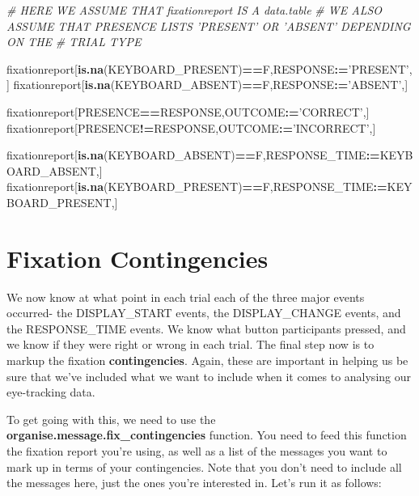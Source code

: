 \documentclass[]{book}
\newenvironment{Shaded}{\begin{snugshade}}{\end{snugshade}}
\newcommand{\CommentTok}[1]{\textcolor[rgb]{0.56,0.35,0.01}{\textit{#1}}}
\newcommand{\ErrorTok}[1]{\textcolor[rgb]{0.64,0.00,0.00}{\textbf{#1}}}
\newcommand{\KeywordTok}[1]{\textcolor[rgb]{0.13,0.29,0.53}{\textbf{#1}}}
\newcommand{\NormalTok}[1]{#1}
\newcommand{\OperatorTok}[1]{\textcolor[rgb]{0.81,0.36,0.00}{\textbf{#1}}}
\newcommand{\StringTok}[1]{\textcolor[rgb]{0.31,0.60,0.02}{#1}}
\begin{document}
\begin{Shaded}
\begin{Highlighting}[]
\CommentTok{# HERE WE ASSUME THAT fixationreport IS A data.table}
\CommentTok{# WE ALSO ASSUME THAT PRESENCE LISTS 'PRESENT' OR 'ABSENT' DEPENDING ON THE}
\CommentTok{# TRIAL TYPE}

\NormalTok{fixationreport[}\KeywordTok{is.na}\NormalTok{(KEYBOARD_PRESENT)}\OperatorTok{==}\NormalTok{F,RESPONSE}\OperatorTok{:}\ErrorTok{=}\StringTok{'PRESENT'}\NormalTok{,]}
\NormalTok{fixationreport[}\KeywordTok{is.na}\NormalTok{(KEYBOARD_ABSENT)}\OperatorTok{==}\NormalTok{F,RESPONSE}\OperatorTok{:}\ErrorTok{=}\StringTok{'ABSENT'}\NormalTok{,]}

\NormalTok{fixationreport[PRESENCE}\OperatorTok{==}\NormalTok{RESPONSE,OUTCOME}\OperatorTok{:}\ErrorTok{=}\StringTok{'CORRECT'}\NormalTok{,]}
\NormalTok{fixationreport[PRESENCE}\OperatorTok{!=}\NormalTok{RESPONSE,OUTCOME}\OperatorTok{:}\ErrorTok{=}\StringTok{'INCORRECT'}\NormalTok{,]}

\NormalTok{fixationreport[}\KeywordTok{is.na}\NormalTok{(KEYBOARD_ABSENT)}\OperatorTok{==}\NormalTok{F,RESPONSE_TIME}\OperatorTok{:}\ErrorTok{=}\NormalTok{KEYBOARD_ABSENT,]}
\NormalTok{fixationreport[}\KeywordTok{is.na}\NormalTok{(KEYBOARD_PRESENT)}\OperatorTok{==}\NormalTok{F,RESPONSE_TIME}\OperatorTok{:}\ErrorTok{=}\NormalTok{KEYBOARD_PRESENT,]}
\end{Highlighting}
\end{Shaded}

\hypertarget{fixation-contingencies}{%
\section{Fixation Contingencies}\label{fixation-contingencies}}

We now know at what point in each trial each of the three major events occurred- the DISPLAY\_START events, the DISPLAY\_CHANGE events, and the RESPONSE\_TIME events. We know what button participants pressed, and we know if they were right or wrong in each trial. The final step now is to markup the fixation \textbf{contingencies}. Again, these are important in helping us be sure that we've included what we want to include when it comes to analysing our eye-tracking data.

To get going with this, we need to use the \textbf{organise.message.fix\_contingencies} function. You need to feed this function the fixation report you're using, as well as a list of the messages you want to mark up in terms of your contingencies. Note that you don't need to include all the messages here, just the ones you're interested in. Let's run it as follows:
\end{document}
